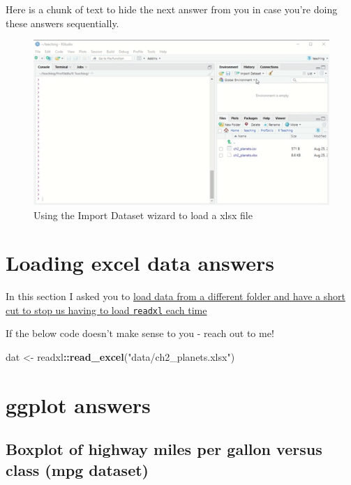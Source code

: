 \documentclass[
]{book}
\newenvironment{Shaded}{\begin{snugshade}}{\end{snugshade}}
\newcommand{\KeywordTok}[1]{\textcolor[rgb]{0.13,0.29,0.53}{\textbf{#1}}}
\newcommand{\NormalTok}[1]{#1}
\newcommand{\OperatorTok}[1]{\textcolor[rgb]{0.81,0.36,0.00}{\textbf{#1}}}
\newcommand{\StringTok}[1]{\textcolor[rgb]{0.31,0.60,0.02}{#1}}
\begin{document}
Here is a chunk of text to hide the next answer from you in case you're doing these answers sequentially.

\begin{figure}

{\centering \includegraphics{images/03_data/excel_open} 

}

\caption{Using the Import Dataset wizard to load a xlsx file}\label{fig:unnamed-chunk-219}
\end{figure}

\hypertarget{ans_loadexcel}{%
\section{Loading excel data answers}\label{ans_loadexcel}}

In this section I asked you to \protect\hyperlink{ex_loadexcel}{load data from a different folder and have a short cut to stop us having to load \texttt{readxl} each time}

If the below code doesn't make sense to you - reach out to me!

\begin{Shaded}
\begin{Highlighting}[]
\NormalTok{dat <-}\StringTok{ }\NormalTok{readxl}\OperatorTok{::}\KeywordTok{read_excel}\NormalTok{(}\StringTok{"data/ch2_planets.xlsx"}\NormalTok{)}
\end{Highlighting}
\end{Shaded}

\hypertarget{gg_answers}{%
\section{ggplot answers}\label{gg_answers}}

\hypertarget{boxplot-of-highway-miles-per-gallon-versus-class-mpg-dataset}{%
\subsection{Boxplot of highway miles per gallon versus class (mpg dataset)}\label{boxplot-of-highway-miles-per-gallon-versus-class-mpg-dataset}}
\end{document}
